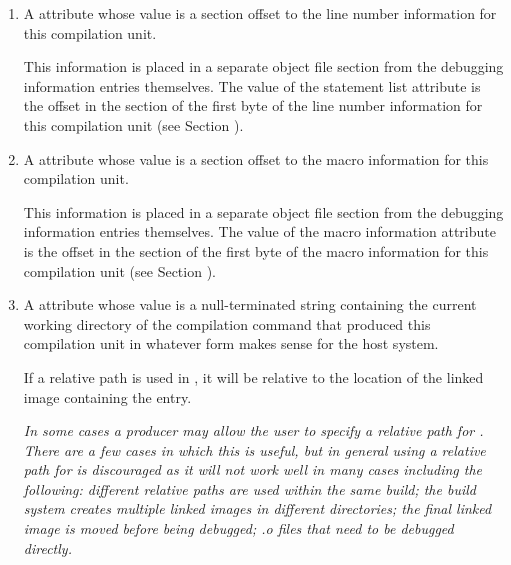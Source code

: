 \begin{enumerate}[1. ]
\item \hypertarget{chap:DWATstmtlistlinenumberinformationforunit}{}
A \DWATstmtlistDEFN{}
attribute whose value is a 
section offset to the line number information for this compilation
unit.

This information is placed in a separate object file
section from the debugging information entries themselves. The
value of the statement list attribute is the offset in the
\dotdebugline{} section of the first byte of the line number
information for this compilation unit 
(see Section ).

\item A \DWATmacrosDEFN{}\hypertarget{chap:DWATmacrosmacroinformation}{}
attribute 
whose value is a 
section offset to the macro information for this compilation unit.

This information is placed in a separate object file section
from the debugging information entries themselves. The
value of the macro information attribute is the offset in
the \dotdebugmacro{} section of the first byte of the macro
information for this compilation unit 
(see Section ).
\db

\item  \hypertarget{chap:DWATcompdircompilationdirectory}{}
A \DWATcompdirDEFN{} attribute 
whose value is a
null-terminated string containing the current working directory
of the compilation command that produced this compilation
unit in whatever form makes sense for the host system.

\bb
If a relative path is used in \DWATcompdirNAME, it will be relative 
to the location of the linked image containing the \DWATcompdirNAME{}
entry.

\textit{In some cases a producer may allow the user to specify a relative
path for \DWATcompdir. There are a few cases in which this is useful,
but in general using a relative path for \DWATcompdir{} is discouraged
as it will not work well in many cases including the following:
different relative paths are used within the same build; the build
system creates multiple linked images in different directories; the
final linked image is moved before being debugged; .o files that need to
be debugged directly.}
\eb


\end{enumerate}
